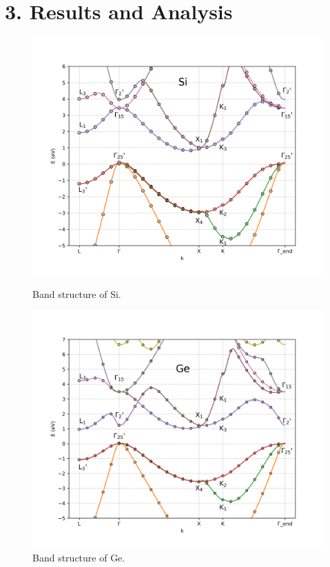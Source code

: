 \documentclass[twocolumn]{article}[h]
\begin{document}
\section*{3. Results and Analysis}
\vspace{-1cm}
\begin{figure}[htb]
    \includegraphics[width=\linewidth]{Si.png}
    \vspace{-1cm}
    \caption{Band structure of Si.}
    \label{fig:Si}

    \includegraphics[width=\linewidth]{Ge.png}
    \vspace{-1cm}
    \caption{Band structure of Ge.}
    \label{fig:Ge}
\end{figure}
\end{document}
